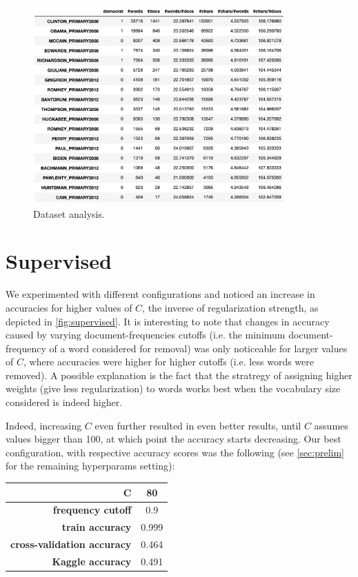 \documentclass[11pt]{article}
\begin{document}
\begin{figure}
  \centering
  \includegraphics[height=3in]{figures/stats.png}
  \caption{Dataset analysis.}
  \label{fig:dataset}
\end{figure}


\section{Supervised}\label{sec:super}

We experimented with different configurations and noticed an increase in accuracies for higher values of $C$, the inverse of regularization strength, as depicted in \cref{fig:supervised}. It is interesting to note that changes in accuracy caused by varying document-frequencies cutoffs (i.e. the minimum document-frequency of a word considered for removal) was only noticeable for larger values of $C$, where accuracies were higher for higher cutoffs (i.e. less words were removed). A possible explanation is the fact that the stratregy of assigning higher weights (give less regularization) to words works best when the vocabulary size considered is indeed higher.

Indeed, increasing $C$ even further resulted in even better results, until $C$ assumes values bigger than 100, at which point the accuracy starts decreasing. Our best configuration, with respective accuracy scores was the following (see \cref{sec:prelim} for the remaining hyperparams setting):

\begin{center}
\begin{tabular}{r|c}
  $\mathbf{C}$ & 80 \\\hline 
  \textbf{frequency cutoff} & 0.9 \\\hline
  \textbf{train accuracy} & 0.999 \\\hline
  \textbf{cross-validation accuracy} & 0.464 \\\hline
  \textbf{Kaggle accuracy}  & 0.491
\end{tabular}
\end{center}
\end{document}
